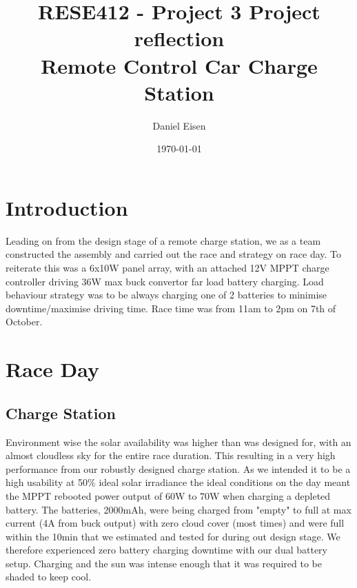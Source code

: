 \documentclass[11pt]{article}
\title{RESE412 - Project 3 	Project reflection \\ Remote Control Car Charge Station}
\author{Daniel Eisen}
\date{\today}
\begin{document}
\maketitle


\section{Introduction}
Leading on from the design stage of a remote charge station, we as a team constructed the assembly and carried out the race and strategy on race day. To reiterate this was a 6x10W panel array, with an attached 12V MPPT charge controller driving 36W max buck convertor far load battery charging. Load behaviour strategy was to be always charging one of 2 batteries to minimise downtime/maximise driving time. Race time was from 11am to 2pm on 7th of October.

\section{Race Day}
\subsection*{Charge Station}
Environment wise the solar availability was higher than was designed for, with an almost cloudless sky for the entire race duration. This resulting in a very high performance from our robustly designed charge station. As we intended it to be a high usability at 50\% ideal solar irradiance the ideal conditions on the day meant the MPPT rebooted power output of 60W to 70W when charging a depleted battery. The batteries, 2000mAh, were being charged from "empty" to full at max current (4A from buck output) with zero cloud cover (most times) and were full within the 10min that we estimated and tested for during out design stage. We therefore experienced zero battery charging downtime with our dual battery setup. Charging and the sun was intense enough that it was required to be shaded to keep cool.
\end{document}

